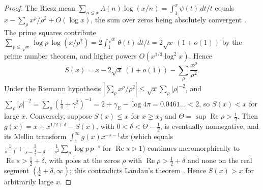 \documentclass[11pt]{amsart}
\theoremstyle{definition}
\theoremstyle{remark}
\numberwithin{equation}{section}
\DeclareMathOperator{\Rel}{Re}
\begin{document}
\begin{proof}
The Riesz mean $\sum_{n\le x}\Lambda(n)\log(x/n)=\int_1^x\psi(t)\,dt/t$ equals
$x-\sum_\rho x^\rho/\rho^2+O(\log x)$, the sum over zeros being absolutely convergent
\cite{Ingham1932}. The prime squares contribute
$\sum_{p\le\sqrt x}\log p\,\log(x/p^2)=2\int_1^{\sqrt x}\theta(t)\,dt/t=2\sqrt x\,(1+o(1))$ by the prime number
theorem, and higher powers $O(x^{1/3}\log^2x)$. Hence
\[
  S(x)=x-2\sqrt x\,(1+o(1))-\sum_\rho\frac{x^\rho}{\rho^2}.
\]
Under the Riemann hypothesis $|\sum_\rho x^\rho/\rho^2|\le\sqrt x\sum_\rho|\rho|^{-2}$, and
$\sum_\rho|\rho|^{-2}=\sum_\rho(\frac14+\gamma^2)^{-1}=2+\gamma_E-\log4\pi=0.0461\ldots<2$, so $S(x)<x$ for large $x$.
Conversely, suppose $S(x)\le x$ for $x\ge x_0$ and $\Theta=\sup\Rel\rho>\frac12$. Then
$g(x)=x+x^{1/2+\delta}-S(x)$, with $0<\delta<\Theta-\frac12$, is eventually nonnegative, and its Mellin transform
$\int_1^\infty g(x)x^{-s-1}dx$ (which equals $\frac1{s-1}+\frac1{s-\frac12-\delta}-\frac1{s^2}\sum_p\log p\,p^{-s}$
for $\Rel s>1$) continues meromorphically to $\Rel s>\frac12+\delta$, with poles at the zeros $\rho$ with
$\Rel\rho>\frac12+\delta$ and none on the real segment $(\frac12+\delta,\infty)$; this contradicts Landau's theorem
\cite[Ch.~V]{Ingham1932}. Hence $S(x)>x$ for arbitrarily large $x$.
\end{proof}
\end{document}
